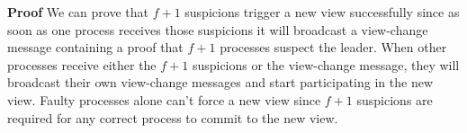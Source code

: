 \textbf{Proof} We can prove that $f+1$ suspicions trigger a new view successfully since as soon as one process receives those suspicions it will broadcast a view-change message containing a proof that $f+1$ processes suspect the leader. When other processes receive either the $f+1$ suspicions or the view-change message, they will broadcast their own view-change messages and start participating in the new view. Faulty processes alone can't force a new view since $f+1$ suspicions are required for any correct process to commit to the new view.\par

